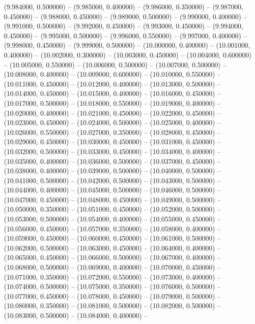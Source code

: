 (9.984000, 0.500000) -- 
(9.985000, 0.400000) -- 
(9.986000, 0.350000) -- 
(9.987000, 0.450000) -- 
(9.988000, 0.450000) -- 
(9.989000, 0.500000) -- 
(9.990000, 0.400000) -- 
(9.991000, 0.500000) -- 
(9.992000, 0.450000) -- 
(9.993000, 0.450000) -- 
(9.994000, 0.450000) -- 
(9.995000, 0.500000) -- 
(9.996000, 0.550000) -- 
(9.997000, 0.400000) -- 
(9.998000, 0.450000) -- 
(9.999000, 0.500000) -- 
(10.000000, 0.400000) -- 
(10.001000, 0.400000) -- 
(10.002000, 0.300000) -- 
(10.003000, 0.450000) -- 
(10.004000, 0.600000) -- 
(10.005000, 0.550000) -- 
(10.006000, 0.500000) -- 
(10.007000, 0.500000) -- 
(10.008000, 0.400000) -- 
(10.009000, 0.600000) -- 
(10.010000, 0.550000) -- 
(10.011000, 0.450000) -- 
(10.012000, 0.400000) -- 
(10.013000, 0.500000) -- 
(10.014000, 0.450000) -- 
(10.015000, 0.400000) -- 
(10.016000, 0.450000) -- 
(10.017000, 0.500000) -- 
(10.018000, 0.550000) -- 
(10.019000, 0.400000) -- 
(10.020000, 0.400000) -- 
(10.021000, 0.450000) -- 
(10.022000, 0.450000) -- 
(10.023000, 0.450000) -- 
(10.024000, 0.500000) -- 
(10.025000, 0.400000) -- 
(10.026000, 0.550000) -- 
(10.027000, 0.350000) -- 
(10.028000, 0.450000) -- 
(10.029000, 0.450000) -- 
(10.030000, 0.450000) -- 
(10.031000, 0.450000) -- 
(10.032000, 0.500000) -- 
(10.033000, 0.450000) -- 
(10.034000, 0.400000) -- 
(10.035000, 0.400000) -- 
(10.036000, 0.500000) -- 
(10.037000, 0.450000) -- 
(10.038000, 0.400000) -- 
(10.039000, 0.500000) -- 
(10.040000, 0.500000) -- 
(10.041000, 0.500000) -- 
(10.042000, 0.500000) -- 
(10.043000, 0.500000) -- 
(10.044000, 0.400000) -- 
(10.045000, 0.500000) -- 
(10.046000, 0.500000) -- 
(10.047000, 0.450000) -- 
(10.048000, 0.450000) -- 
(10.049000, 0.500000) -- 
(10.050000, 0.350000) -- 
(10.051000, 0.450000) -- 
(10.052000, 0.500000) -- 
(10.053000, 0.500000) -- 
(10.054000, 0.400000) -- 
(10.055000, 0.450000) -- 
(10.056000, 0.450000) -- 
(10.057000, 0.350000) -- 
(10.058000, 0.400000) -- 
(10.059000, 0.450000) -- 
(10.060000, 0.450000) -- 
(10.061000, 0.500000) -- 
(10.062000, 0.500000) -- 
(10.063000, 0.450000) -- 
(10.064000, 0.400000) -- 
(10.065000, 0.450000) -- 
(10.066000, 0.500000) -- 
(10.067000, 0.400000) -- 
(10.068000, 0.500000) -- 
(10.069000, 0.400000) -- 
(10.070000, 0.450000) -- 
(10.071000, 0.350000) -- 
(10.072000, 0.550000) -- 
(10.073000, 0.400000) -- 
(10.074000, 0.500000) -- 
(10.075000, 0.350000) -- 
(10.076000, 0.500000) -- 
(10.077000, 0.450000) -- 
(10.078000, 0.450000) -- 
(10.079000, 0.500000) -- 
(10.080000, 0.350000) -- 
(10.081000, 0.500000) -- 
(10.082000, 0.500000) -- 
(10.083000, 0.500000) -- 
(10.084000, 0.400000) -- 
